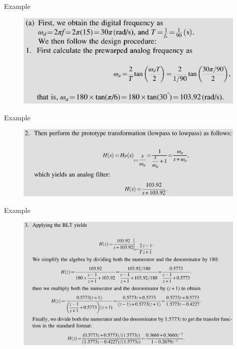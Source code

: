 \documentclass[pdflatex,compress,mathserif]{beamer}
\begin{document}
\begin{frame}{Example}
    \begin{figure}
        \centering
        \includegraphics[width=\linewidth]{./img/img10.png}
    \end{figure}
\end{frame}

\begin{frame}{Example}
    \begin{figure}
        \centering
        \includegraphics[width=\linewidth]{./img/img11.png}
    \end{figure}
\end{frame}

\begin{frame}{Example}
    \begin{figure}
        \centering
        \includegraphics[width=\linewidth]{./img/img12.png}
    \end{figure}
\end{frame}
\end{document}
